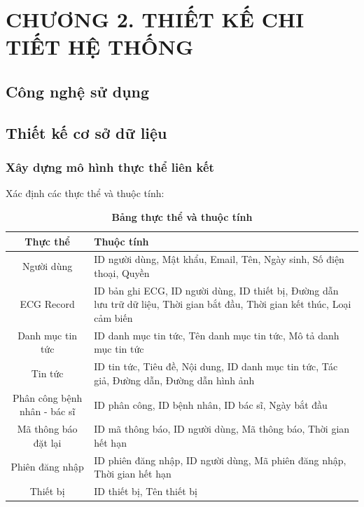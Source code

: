 \documentclass{article}%
\begin{document}
\newpage

\section*{CHƯƠNG 2. THIẾT KẾ CHI TIẾT HỆ THỐNG}
\setcounter{section}{2}
\setcounter{subsection}{0} %
\setcounter{table}{0} %
\setcounter{figure}{0} %

\subsection{Công nghệ sử dụng}



\subsection{Thiết kế cơ sở dữ liệu}

\subsubsection{Xây dựng mô hình thực thể liên kết}

Xác định các thực thể và thuộc tính:


\begin{table}[H]
  \caption{\bfseries \fontsize{12pt}{0pt}\selectfont Bảng thực thể và thuộc tính}
  \centering
  \begin{tabularx}{0.9\textwidth}{|c|X|}
    \hline
    \textbf{Thực thể} & \textbf{Thuộc tính} \\
    \hline
    Người dùng & 
    ID người dùng, Mật khẩu, Email, Tên, Ngày sinh, Số điện thoại, Quyền \\
    \hline
    ECG Record & 
    ID bản ghi ECG, ID người dùng, ID thiết bị, Đường dẫn lưu trữ dữ liệu, Thời gian bắt đầu, Thời gian kết thúc, Loại cảm biến \\
    \hline
    Danh mục tin tức & 
    ID danh mục tin tức, Tên danh mục tin tức, Mô tả danh mục tin tức \\
    \hline
    Tin tức & 
    ID tin tức, Tiêu đề, Nội dung, ID danh mục tin tức, Tác giả, Đường dẫn, Đường dẫn hình ảnh \\
    \hline
    Phân công bệnh nhân - bác sĩ & 
    ID phân công, ID bệnh nhân, ID bác sĩ, Ngày bắt đầu \\
    \hline
    Mã thông báo đặt lại & 
    ID mã thông báo, ID người dùng, Mã thông báo, Thời gian hết hạn \\
    \hline
    Phiên đăng nhập & 
    ID phiên đăng nhập, ID người dùng, Mã phiên đăng nhập, Thời gian hết hạn \\
    \hline
    Thiết bị & 
    ID thiết bị, Tên thiết bị \\
    \hline
  \end{tabularx}
\end{table}
\end{document}
